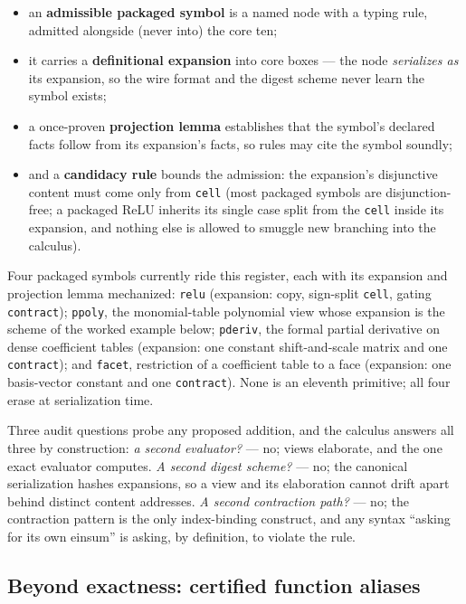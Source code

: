 \begin{itemize}
\item an \textbf{admissible packaged symbol} is a named node with a
  typing rule, admitted alongside (never into) the core ten;
\item it carries a \textbf{definitional expansion} into core boxes
  --- the node \emph{serializes as} its expansion, so the wire format
  and the digest scheme never learn the symbol exists;
\item a once-proven \textbf{projection lemma} establishes that the
  symbol's declared facts follow from its expansion's facts, so rules
  may cite the symbol soundly;
\item and a \textbf{candidacy rule} bounds the admission: the
  expansion's disjunctive content must come only from \texttt{cell}
  (most packaged symbols are disjunction-free; a packaged ReLU
  inherits its single case split from the \texttt{cell} inside its
  expansion, and nothing else is allowed to smuggle new branching
  into the calculus).
\end{itemize}

Four packaged symbols currently ride this register, each with its
expansion and projection lemma mechanized: \texttt{relu} (expansion:
copy, sign-split \texttt{cell}, gating \texttt{contract});
\texttt{ppoly}, the monomial-table polynomial view whose expansion is
the scheme of the worked example below; \texttt{pderiv}, the formal
partial derivative on dense coefficient tables (expansion: one
constant shift-and-scale matrix and one \texttt{contract});
and \texttt{facet}, restriction of a coefficient table to a face
(expansion: one basis-vector constant and one \texttt{contract}).
None is an eleventh primitive; all four erase at serialization time.

Three audit questions probe any proposed addition, and the calculus
answers all three by construction: \emph{a second evaluator?} --- no; views elaborate, and
the one exact evaluator computes. \emph{A second digest scheme?} ---
no; the canonical serialization hashes expansions, so a view and its
elaboration cannot drift apart behind distinct content addresses.
\emph{A second contraction path?} --- no; the contraction pattern is
the only index-binding construct, and any syntax ``asking for its own
einsum'' is asking, by definition, to violate the rule.

\subsection*{Beyond exactness: certified function aliases}

